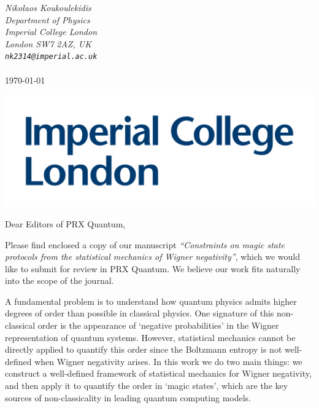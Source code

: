 \documentclass[11pt]{letter}
\begin{document}
\hfill\begin{minipage}{6cm}
	\raggedright
	\vspace{-2.5cm}
	{\footnotesize\itshape Nikolaos Koukoulekidis}\\
	{\footnotesize\itshape Department of Physics}\\
	{\footnotesize\itshape Imperial College London}\\
	{\footnotesize\itshape London SW7 2AZ, UK}\\
	{\footnotesize\itshape %
		\verb|nk2314@imperial.ac.uk|}\\
	~\\
		\footnotesize\today
\end{minipage}

\vspace{-3.5cm}
\includegraphics[scale=.1]{icllogo.png}
\vspace{3.5cm}

\vspace{-1.5cm}
Dear Editors of PRX Quantum,

\vspace{.3cm}
	
Please find enclosed a copy of our manuscript \emph{``Constraints on magic state protocols from the statistical mechanics of Wigner negativity''}, which we would like to submit for review in PRX Quantum. 
We believe our work fits naturally into the scope of the journal. 

A fundamental problem is to understand how quantum physics admits higher degrees of order than possible in classical physics. One signature of this non-classical order is the appearance of `negative probabilities' in the Wigner representation of quantum systems. However, statistical mechanics cannot be directly applied to quantify this order since the Boltzmann entropy is not well-defined when Wigner negativity arises. In this work we do two main things: we construct a well-defined framework of statistical mechanics for Wigner negativity, and then apply it to quantify the order in `magic states', which are the key sources of non-classicality in leading quantum computing models. 
\end{document}
